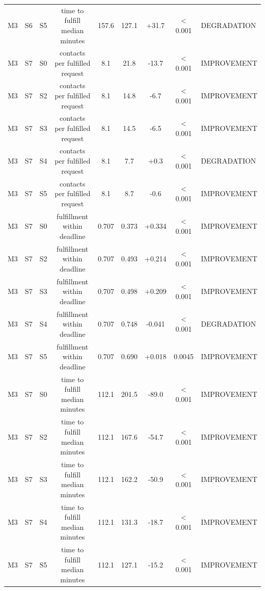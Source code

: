 \begin{table}[t]
\begin{tabular}{lllcccccl}
M3 & S6 & S5 & time to fulfill median minutes & 157.6 & 127.1 & +31.7 & < 0.001 & DEGRADATION \\
M3 & S7 & S0 & contacts per fulfilled request & 8.1 & 21.8 & -13.7 & < 0.001 & IMPROVEMENT \\
M3 & S7 & S2 & contacts per fulfilled request & 8.1 & 14.8 & -6.7 & < 0.001 & IMPROVEMENT \\
M3 & S7 & S3 & contacts per fulfilled request & 8.1 & 14.5 & -6.5 & < 0.001 & IMPROVEMENT \\
M3 & S7 & S4 & contacts per fulfilled request & 8.1 & 7.7 & +0.3 & < 0.001 & DEGRADATION \\
M3 & S7 & S5 & contacts per fulfilled request & 8.1 & 8.7 & -0.6 & < 0.001 & IMPROVEMENT \\
M3 & S7 & S0 & fulfillment within deadline & 0.707 & 0.373 & +0.334 & < 0.001 & IMPROVEMENT \\
M3 & S7 & S2 & fulfillment within deadline & 0.707 & 0.493 & +0.214 & < 0.001 & IMPROVEMENT \\
M3 & S7 & S3 & fulfillment within deadline & 0.707 & 0.498 & +0.209 & < 0.001 & IMPROVEMENT \\
M3 & S7 & S4 & fulfillment within deadline & 0.707 & 0.748 & -0.041 & < 0.001 & DEGRADATION \\
M3 & S7 & S5 & fulfillment within deadline & 0.707 & 0.690 & +0.018 & 0.0045 & IMPROVEMENT \\
M3 & S7 & S0 & time to fulfill median minutes & 112.1 & 201.5 & -89.0 & < 0.001 & IMPROVEMENT \\
M3 & S7 & S2 & time to fulfill median minutes & 112.1 & 167.6 & -54.7 & < 0.001 & IMPROVEMENT \\
M3 & S7 & S3 & time to fulfill median minutes & 112.1 & 162.2 & -50.9 & < 0.001 & IMPROVEMENT \\
M3 & S7 & S4 & time to fulfill median minutes & 112.1 & 131.3 & -18.7 & < 0.001 & IMPROVEMENT \\
M3 & S7 & S5 & time to fulfill median minutes & 112.1 & 127.1 & -15.2 & < 0.001 & IMPROVEMENT \\
\bottomrule
\end{tabular}
\end{table}
